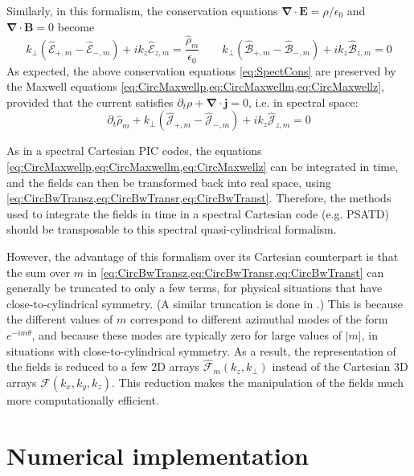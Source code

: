 \documentclass[1p,times,authoryear]{elsarticle}
\renewcommand{\vec}[1]{\boldsymbol{#1}}
\newcommand{\spectral}[1]{\hat{\mathcal{#1}}}
\begin{document}
Similarly, in this formalism, the conservation equations
$\vec{\nabla}\cdot\vec{E}=\rho/\epsilon_0$ and
$\vec{\nabla}\cdot\vec{B} = 0$
become
\begin{equation}
\label{eq:SpectCons}
k_\perp (\spectral{E}_{+,m} -\spectral{E}_{-,m}) + ik_z \spectral{E}_{z,m} =
\frac{\spectral{\rho}_m}{\epsilon_0} \qquad
 k_\perp (\spectral{B}_{+,m} -\spectral{B}_{-,m}) + ik_z \spectral{B}_{z,m} =
0 \end{equation}
As expected, the above conservation equations \cref{eq:SpectCons} are
preserved by the Maxwell equations
\cref{eq:CircMaxwellp,eq:CircMaxwellm,eq:CircMaxwellz}, provided
that the current satisfies $\partial_t
\rho + \vec{\nabla} \cdot \vec{j} = 0$, i.e. in spectral space:
\begin{equation}
\label{eq:SpectCharge}
\partial_t \spectral{\rho}_m + k_\perp (\spectral{J}_{+,m} -\spectral{J}_{-,m}) + ik_z
\spectral{J}_{z,m} = 0
\end{equation}  

As in a spectral Cartesian PIC codes, the equations
\cref{eq:CircMaxwellp,eq:CircMaxwellm,eq:CircMaxwellz}  
can be integrated in time, and the fields can then be transformed back into
real space, using \cref{eq:CircBwTransz,eq:CircBwTransr,eq:CircBwTranst}. Therefore,
the methods used to integrate the fields in time in a spectral Cartesian
code (e.g. PSATD) should be transposable to this spectral quasi-cylindrical formalism.

However, the advantage of this formalism over its Cartesian
counterpart is that the sum over $m$ in
\cref{eq:CircBwTransz,eq:CircBwTransr,eq:CircBwTranst} can generally
be truncated to only a few terms, for physical situations that have
close-to-cylindrical symmetry. (A similar truncation is done in \citep{Lifschitz}.) This is because the
different values of $m$ correspond to different azimuthal modes of the
form $e^{-im\theta}$, and because these modes are typically zero for
large values of $|m|$, in situations with close-to-cylindrical symmetry.
As a result, the representation of the fields is
reduced to a few 2D arrays $\spectral{F}_m(k_z,k_\perp )$ instead of the
Cartesian 3D arrays $\mathcal{F}(k_x,k_y,k_z)$. This reduction makes
the manipulation of the fields much more computationally efficient.

\section{Numerical implementation}
\label{sec:implementation}
\end{document}
